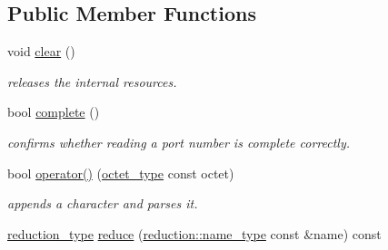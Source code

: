 \subsection*{Public Member Functions}
\begin{DoxyCompactItemize}
\item 
\hypertarget{classhryky_1_1ip_1_1port_1_1_writer_a49484f2c4963f8ea32ccacfef26a640a}{void \hyperlink{classhryky_1_1ip_1_1port_1_1_writer_a49484f2c4963f8ea32ccacfef26a640a}{clear} ()}\label{classhryky_1_1ip_1_1port_1_1_writer_a49484f2c4963f8ea32ccacfef26a640a}

\begin{DoxyCompactList}\small\item\em releases the internal resources. \end{DoxyCompactList}\item 
\hypertarget{classhryky_1_1ip_1_1port_1_1_writer_ad376f9522356a8e10ea63d31c37c6aeb}{bool \hyperlink{classhryky_1_1ip_1_1port_1_1_writer_ad376f9522356a8e10ea63d31c37c6aeb}{complete} ()}\label{classhryky_1_1ip_1_1port_1_1_writer_ad376f9522356a8e10ea63d31c37c6aeb}

\begin{DoxyCompactList}\small\item\em confirms whether reading a port number is complete correctly. \end{DoxyCompactList}\item 
\hypertarget{classhryky_1_1ip_1_1port_1_1_writer_ae6005e2bb1ee6df756a3f3f5c3ec6e0e}{bool \hyperlink{classhryky_1_1ip_1_1port_1_1_writer_ae6005e2bb1ee6df756a3f3f5c3ec6e0e}{operator()} (\hyperlink{namespacehryky_a488cba8b666be33ccca70e819684e3c8}{octet\-\_\-type} const octet)}\label{classhryky_1_1ip_1_1port_1_1_writer_ae6005e2bb1ee6df756a3f3f5c3ec6e0e}

\begin{DoxyCompactList}\small\item\em appends a character and parses it. \end{DoxyCompactList}\item 
\hypertarget{classhryky_1_1ip_1_1port_1_1_writer_ab4757e3dc1477c201a2e412b679cf2eb}{\hyperlink{namespacehryky_a343a9a4c36a586be5c2693156200eadc}{reduction\-\_\-type} \hyperlink{classhryky_1_1ip_1_1port_1_1_writer_ab4757e3dc1477c201a2e412b679cf2eb}{reduce} (\hyperlink{namespacehryky_1_1reduction_ac686c30a4c8d196bbd0f05629a6b921f}{reduction\-::name\-\_\-type} const \&name) const }\label{classhryky_1_1ip_1_1port_1_1_writer_ab4757e3dc1477c201a2e412b679cf2eb}


\end{DoxyCompactItemize}
